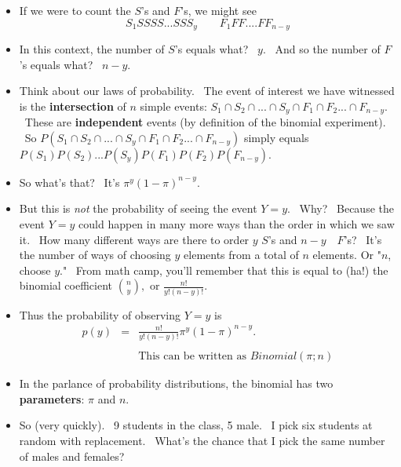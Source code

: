 \documentclass[11pt]{article}
\begin{document}
\begin{itemize}
\item If we were to count the $S$'s and $F$'s, we might see%
\begin{equation*}
S_{1}SSSS...SSS_{y}\qquad F_{1}FF....FF_{n-y}
\end{equation*}

\item In this context, the number of $S$'s equals what? \ $y$. \ And so the
number of $F$'s equals what? \ $n-y.$

\item Think about our laws of probability. \ The event of interest we have
witnessed is the \textbf{intersection }of $n$ simple events: $S_{1}\cap
S_{2}\cap ...\cap S_{y}\cap F_{1}\cap F_{2}...\cap F_{n-y}.$ \ These are 
\textbf{independent }events (by definition of the binomial experiment). \ So 
$P(S_{1}\cap S_{2}\cap ...\cap S_{y}\cap F_{1}\cap F_{2}...\cap F_{n-y})$
simply equals $P(S_{1})P(S_{2})...P(S_{y})P(F_{1})P(F_{2})P(F_{n-y}).$

\item So what's that? \ It's $\pi ^{y}\left( 1-\pi \right) ^{n-y}.$

\item But this is \textit{not }the probability of seeing the event $Y=y.$ \
Why? \ Because the event $Y=y$ could happen in many more ways than the order
in which we saw it. \ How many different ways are there to order $y$ $S$'s
and $n-y\quad F$'s? \ It's the number of ways of choosing $y$ elements from
a total of $n$ elements. Or "$n$, choose $y$." \ From math camp, you'll
remember that this is equal to (ha!) the binomial coefficient $\binom{n}{y},$%
or $\frac{n!}{y!(n-y)!}.$

\item Thus the probability of observing $Y=y$ is 
\begin{eqnarray*}
p(y) &=&\frac{n!}{y!(n-y)!}\pi ^{y}(1-\pi )^{n-y}. \\
&& \\
&&\text{This can be written as }Binomial(\pi ;n)
\end{eqnarray*}

\item In the parlance of probability distributions, the binomial has two 
\textbf{parameters}: $\pi $ and $n$.

\item So (very quickly). \ 9 students in the class, 5 male. \ I pick six
students at random with replacement. \ What's the chance that I pick the
same number of males and females?


\end{itemize}
\end{document}
